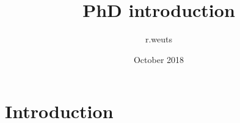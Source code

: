 \documentclass{article}
\title{PhD introduction}
\author{r.weuts }
\date{October 2018}
\begin{document}
\maketitle

\section{Introduction}
\end{document}
